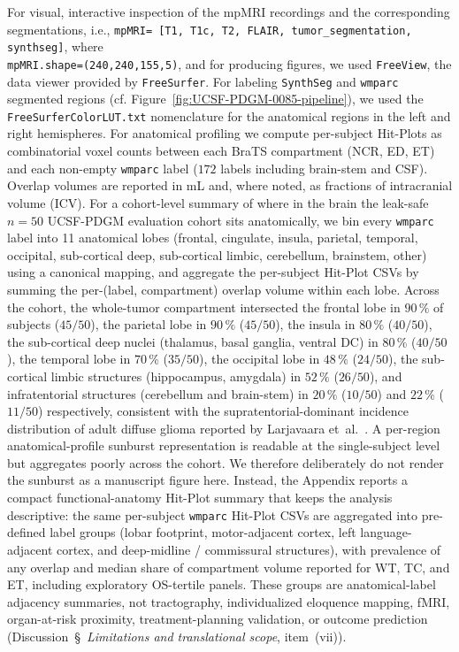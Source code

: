 \documentclass[a4paper,11pt,leqno]{article}
\begin{document}
For visual, interactive inspection of the mpMRI recordings and the
corresponding segmentations, i.e.,
{\small \texttt{mpMRI= [T1, T1c, T2, FLAIR, tumor\_segmentation, synthseg]}}, where\\
{\small \texttt{mpMRI.shape=(240,240,155,5)}}, and
for producing figures, we used \texttt{FreeView}, the data viewer provided by
\texttt{FreeSurfer}. For labeling \texttt{SynthSeg} and \texttt{wmparc} segmented regions
(cf. Figure~\ref{fig:UCSF-PDGM-0085-pipeline}), we used the\\ \texttt{FreeSurferColorLUT.txt} nomenclature for the anatomical regions
in the left and right hemispheres. For anatomical profiling we compute per-subject Hit-Plots as combinatorial voxel counts between each BraTS compartment (NCR, ED, ET) and each non-empty \texttt{wmparc} label ($172$ labels including brain-stem and CSF). Overlap volumes are reported in mL and, where noted, as fractions of intracranial volume (ICV).
For a cohort-level summary of where in the brain the leak-safe
$n=50$ UCSF-PDGM evaluation cohort sits anatomically, we bin every
\texttt{wmparc} label into 11 anatomical lobes (frontal, cingulate,
insula, parietal, temporal, occipital, sub-cortical deep,
sub-cortical limbic, cerebellum, brainstem, other) using a canonical
mapping, and aggregate the per-subject Hit-Plot CSVs by summing the
per-(label, compartment) overlap volume within each lobe. Across the
cohort, the whole-tumor compartment intersected the frontal lobe in
$90\,\%$ of subjects ($45/50$), the parietal lobe in $90\,\%$
($45/50$), the insula in $80\,\%$ ($40/50$), the sub-cortical deep
nuclei (thalamus, basal ganglia, ventral DC) in $80\,\%$ ($40/50$),
the temporal lobe in $70\,\%$ ($35/50$), the occipital lobe in
$48\,\%$ ($24/50$), the sub-cortical limbic structures (hippocampus,
amygdala) in $52\,\%$ ($26/50$), and infratentorial structures
(cerebellum and brain-stem) in $20\,\%$ ($10/50$) and $22\,\%$
($11/50$) respectively, consistent with the supratentorial-dominant
incidence distribution of adult diffuse glioma reported by
Larjavaara et~al.~\cite{Larjavaara2007}. A per-region
anatomical-profile sunburst representation is readable at the
single-subject level but aggregates poorly across the cohort. We therefore deliberately do not render the sunburst as a manuscript
figure here. Instead, the Appendix reports a compact
functional-anatomy Hit-Plot summary that keeps the analysis
descriptive: the same per-subject \texttt{wmparc} Hit-Plot CSVs are
aggregated into pre-defined label groups (lobar footprint,
motor-adjacent cortex, left language-adjacent cortex, and
deep-midline / commissural structures), with prevalence of any
overlap and median share of compartment volume reported for WT, TC,
and ET, including exploratory OS-tertile panels. These groups are
anatomical-label adjacency summaries, not tractography,
individualized eloquence mapping, fMRI, organ-at-risk proximity,
treatment-planning validation, or outcome prediction
(Discussion~\S~\emph{Limitations and translational scope},
item~(vii)).\\
\end{document}
